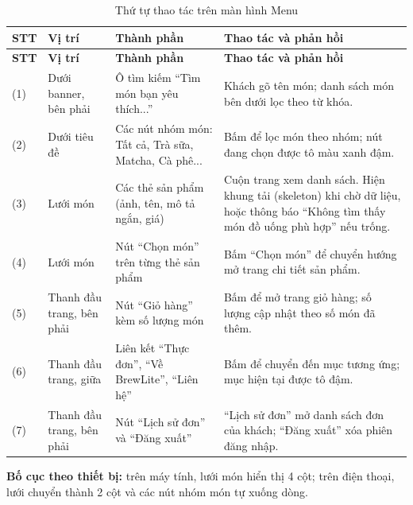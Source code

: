 \begin{minipage}{\textwidth}
\centering
{}
\label{fig:wf-menu}
\end{minipage}
\vspace{10pt}

\begin{longtable}{|p{1.0cm}|p{2.5cm}|p{4.5cm}|p{5.5cm}|}
  \caption{Thứ tự thao tác trên màn hình Menu}\label{tab:wf-menu}\\
  \hline
  \textbf{STT} & \textbf{Vị trí} & \textbf{Thành phần} & \textbf{Thao tác và phản hồi} \\
  \hline
  \endfirsthead
  \hline
  \textbf{STT} & \textbf{Vị trí} & \textbf{Thành phần} & \textbf{Thao tác và phản hồi} \\
  \hline
  \endhead
  (1) & Dưới banner, bên phải & Ô tìm kiếm ``Tìm món bạn yêu thích...'' & Khách gõ tên món; danh sách món bên dưới lọc theo từ khóa. \\
  \hline
  (2) & Dưới tiêu đề & Các nút nhóm món: Tất cả, Trà sữa, Matcha, Cà phê... & Bấm để lọc món theo nhóm; nút đang chọn được tô màu xanh đậm. \\
  \hline
  (3) & Lưới món & Các thẻ sản phẩm (ảnh, tên, mô tả ngắn, giá) & Cuộn trang xem danh sách. Hiện khung tải (skeleton) khi chờ dữ liệu, hoặc thông báo ``Không tìm thấy món đồ uống phù hợp'' nếu trống. \\
  \hline
  (4) & Lưới món & Nút ``Chọn món'' trên từng thẻ sản phẩm & Bấm ``Chọn món'' để chuyển hướng mở trang chi tiết sản phẩm. \\
  \hline
  (5) & Thanh đầu trang, bên phải & Nút ``Giỏ hàng'' kèm số lượng món & Bấm để mở trang giỏ hàng; số lượng cập nhật theo số món đã thêm. \\
  \hline
  (6) & Thanh đầu trang, giữa & Liên kết ``Thực đơn'', ``Về BrewLite'', ``Liên hệ'' & Bấm để chuyển đến mục tương ứng; mục hiện tại được tô đậm. \\
  \hline
  (7) & Thanh đầu trang, bên phải & Nút ``Lịch sử đơn'' và ``Đăng xuất'' & ``Lịch sử đơn'' mở danh sách đơn của khách; ``Đăng xuất'' xóa phiên đăng nhập. \\
  \hline
\end{longtable}

\textbf{Bố cục theo thiết bị:} trên máy tính, lưới món hiển thị 4 cột; trên điện thoại, lưới chuyển thành 2 cột và các nút nhóm món tự xuống dòng.

